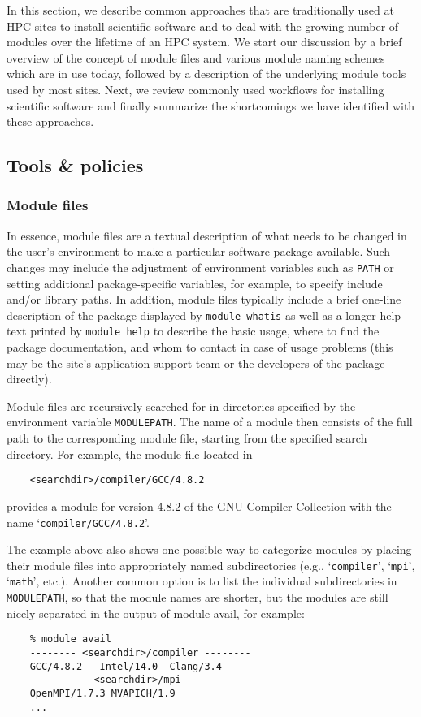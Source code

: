 In this section, we describe common approaches that are traditionally used at
HPC sites to install scientific software and to deal with the growing number
of modules over the lifetime of an HPC system. We start our discussion by a
brief overview of the concept of module files and various module naming
schemes which are in use today, followed by a description of the underlying
module tools used by most sites. Next, we review commonly used workflows for
installing scientific software and finally summarize the shortcomings we have
identified with these approaches.

\subsection{Tools \& policies}

\subsubsection{Module files}

In essence, module files are a textual description of what needs to be
changed in the user's environment to make a particular software package
available. Such changes may include the adjustment of environment variables
such as \texttt{PATH} or setting additional package-specific variables, for
example, to specify include and/or library paths. In addition, module files
typically include a brief one-line description of the package displayed by
\texttt{module whatis} as well as a longer help text printed by
\texttt{module help} to describe the basic usage, where to find the package
documentation, and whom to contact in case of usage problems (this may be the
site's application support team or the developers of the package directly).

Module files are recursively searched for in directories specified by the
environment variable \texttt{MODULEPATH}. The name of a module then consists
of the full path to the corresponding module file, starting from the
specified search directory. For example, the module file located in
\begin{verbatim}
    <searchdir>/compiler/GCC/4.8.2
\end{verbatim}
provides a module for version 4.8.2 of the GNU Compiler Collection with the
name `\texttt{compiler/GCC/4.8.2}'.

The example above also shows one possible way to categorize modules by
placing their module files into appropriately named subdirectories (e.g.,
`\texttt{compiler}', `\texttt{mpi}', `\texttt{math}', etc.). Another common
option is to list the individual subdirectories in \texttt{MODULEPATH}, so
that the module names are shorter, but the modules are still nicely separated
in the output of module avail, for example:
\begin{verbatim}
    % module avail
    -------- <searchdir>/compiler --------
    GCC/4.8.2   Intel/14.0  Clang/3.4
    ---------- <searchdir>/mpi -----------
    OpenMPI/1.7.3 MVAPICH/1.9
    ...
\end{verbatim}

